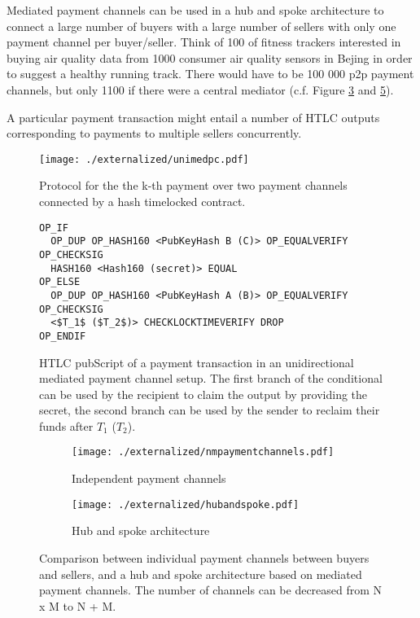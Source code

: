 Mediated payment channels can be used in a hub and spoke architecture to connect a large number of buyers with a large number of sellers with only one payment channel per buyer/seller. Think of 100 of fitness trackers interested in buying air quality data from 1000 consumer air quality sensors in Bejing in order to suggest a healthy running track. There would have to be 100 000 p2p payment channels, but only 1100 if there were a central mediator (c.f. Figure \ref{fig:nmpaymentchannels} and \ref{fig:hubandspoke}).


A particular payment transaction might entail a number of HTLC outputs corresponding to payments to multiple sellers concurrently.

\begin{figure}
\centering
\texttt{[image: ./externalized/unimedpc.pdf]}
\caption{Protocol for the the k-th payment over two payment channels connected by a hash timelocked contract.}
\label{fig:unimedpc}
\end{figure}

\begin{figure}
\begin{lstlisting}[breaklines,mathescape=true]
OP_IF
  OP_DUP OP_HASH160 <PubKeyHash B (C)> OP_EQUALVERIFY OP_CHECKSIG
  HASH160 <Hash160 (secret)> EQUAL
OP_ELSE
  OP_DUP OP_HASH160 <PubKeyHash A (B)> OP_EQUALVERIFY OP_CHECKSIG
  <$T_1$ ($T_2$)> CHECKLOCKTIMEVERIFY DROP
OP_ENDIF
\end{lstlisting} 
\caption{HTLC pubScript of a payment transaction in an unidirectional mediated payment channel setup. The first branch of the conditional can be used by the recipient to claim the output by providing the secret, the second branch can be used by the sender to reclaim their funds after $T_1$ ($T_2$).}
\label{fig:pubScriptHTLC}
\end{figure}



\begin{figure}[ht]
  \centering
  \begin{subfigure}[t]{0.5\linewidth}
    \centering\texttt{[image: ./externalized/nmpaymentchannels.pdf]}
    \caption{Independent payment channels\label{fig:nmpaymentchannels}}
  \end{subfigure}%
  \begin{subfigure}[t]{0.5\linewidth}
    \centering\texttt{[image: ./externalized/hubandspoke.pdf]}
    \caption{Hub and spoke architecture\label{fig:hubandspoke}}
  \end{subfigure}
  \caption{Comparison between individual payment channels between buyers and sellers, and a hub and spoke architecture based on mediated payment channels. The number of channels can be decreased from N x M to N + M.}
\end{figure}


